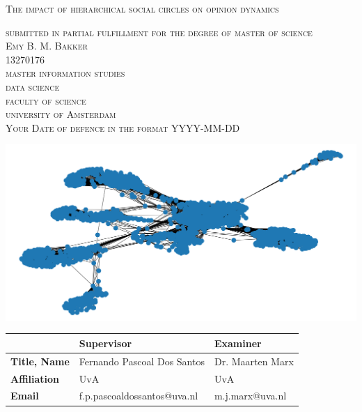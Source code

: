 
\begin{titlepage}


\begin{center}
 
\textsc{\Large   The impact of hierarchical social circles on opinion dynamics}

\bigskip

\textsc{\large
submitted in partial fulfillment for the degree of master of science\\
%
\bigskip
Emy B. M. Bakker\\
%
13270176\\
%
\bigskip
master information studies\\
%
data science \\
%
faculty of science\\
%
university of Amsterdam\\
%
\bigskip
Your Date of defence in the format YYYY-MM-DD
}

\end{center}
 
\vfill

\begin{center}
\includegraphics[height=.4\textheight]{ThesisTemplate/Style/TitlePages/logos/Facebook_network.png} %
\end{center}

\vfill

\begin{center}
\begin{tabular}{|l||ll|}
\hline
 & \textbf{Supervisor} & \textbf{Examiner}  \\   
 \hline
\textbf{Title, Name} & Fernando Pascoal Dos Santos & Dr. Maarten Marx\\
\textbf{Affiliation} & UvA & UvA\\ 
\textbf{Email} & f.p.pascoaldossantos@uva.nl & m.j.marx@uva.nl \\
\hline
\end{tabular}
\end{center}


\end{titlepage}
